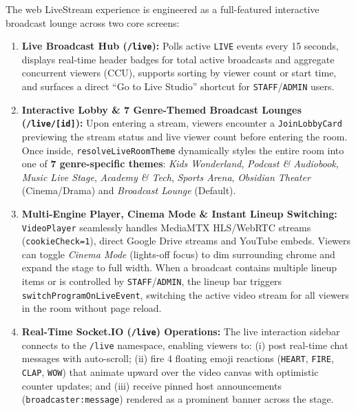 {\begin{enumerate}[leftmargin=*,itemsep=2pt]
\end{enumerate}
}{
The web LiveStream experience is engineered as a full-featured interactive broadcast lounge across two core screens:
\begin{enumerate}[leftmargin=*,itemsep=2pt]
  \item \textbf{Live Broadcast Hub (\texttt{/live}):} Polls active \texttt{LIVE} events every 15 seconds, displays real-time header badges for total active broadcasts and aggregate concurrent viewers (CCU), supports sorting by viewer count or start time, and surfaces a direct ``Go to Live Studio'' shortcut for \texttt{STAFF}/\texttt{ADMIN} users.
  \item \textbf{Interactive Lobby \& 7 Genre-Themed Broadcast Lounges (\texttt{/live/[id]}):} Upon entering a stream, viewers encounter a \texttt{JoinLobbyCard} previewing the stream status and live viewer count before entering the room. Once inside, \texttt{resolveLiveRoomTheme} dynamically styles the entire room into one of \textbf{7 genre-specific themes}: \emph{Kids Wonderland}, \emph{Podcast \& Audiobook}, \emph{Music Live Stage}, \emph{Academy \& Tech}, \emph{Sports Arena}, \emph{Obsidian Theater} (Cinema/Drama) and \emph{Broadcast Lounge} (Default).
  \item \textbf{Multi-Engine Player, Cinema Mode \& Instant Lineup Switching:} \texttt{VideoPlayer} seamlessly handles MediaMTX HLS/WebRTC streams (\texttt{cookieCheck=1}), direct Google Drive streams and YouTube embeds. Viewers can toggle \emph{Cinema Mode} (lights-off focus) to dim surrounding chrome and expand the stage to full width. When a broadcast contains multiple lineup items or is controlled by \texttt{STAFF}/\texttt{ADMIN}, the lineup bar triggers \texttt{switchProgramOnLiveEvent}, switching the active video stream for all viewers in the room without page reload.
  \item \textbf{Real-Time Socket.IO (\texttt{/live}) Operations:} The live interaction sidebar connects to the \texttt{/live} namespace, enabling viewers to: (i) post real-time chat messages with auto-scroll; (ii) fire 4 floating emoji reactions (\texttt{HEART}, \texttt{FIRE}, \texttt{CLAP}, \texttt{WOW}) that animate upward over the video canvas with optimistic counter updates; and (iii) receive pinned host announcements (\texttt{broadcaster:message}) rendered as a prominent banner across the stage.
\end{enumerate}
}

\subsection{}


